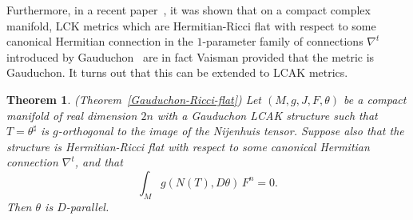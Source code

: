 \documentclass[a4paper,11pt]{amsart}
\newtheorem*{thm*}{Theorem}
\newtheorem*{cor*}{Corollary}
\theoremstyle{definition}
\renewcommand{\[}{\begin{equation*}}
\renewcommand{\]}{\end{equation*}}
\begin{document}

Furthermore, in a recent paper~\cite{barbaro2025calabiyaulocallyconformallykahler}, it was shown that on a compact complex manifold, LCK metrics which are Hermitian-Ricci flat  with respect to some canonical Hermitian connection in the $1$-parameter family of connections $\nabla^t$ introduced by Gauduchon~\cite{MR1456265} are in fact Vaisman provided that the metric is Gauduchon. It turns out that this can be extended to LCAK metrics.

\begin{thm*}(Theorem~\ref{Gauduchon-Ricci-flat})
Let $(M, g, J, F, \theta)$ be a compact manifold of real dimension $2n$ with a Gauduchon LCAK structure such that $T=\theta^\sharp$ is $g$-orthogonal to the image of the Nijenhuis tensor. Suppose also that the structure is Hermitian-Ricci flat with respect to some canonical Hermitian connection $\nabla^t$, and that $$\int_Mg(N(T),D\theta)\,F^n=0.$$ Then $\theta$ is $D$-parallel.
\end{thm*}
\end{document}
